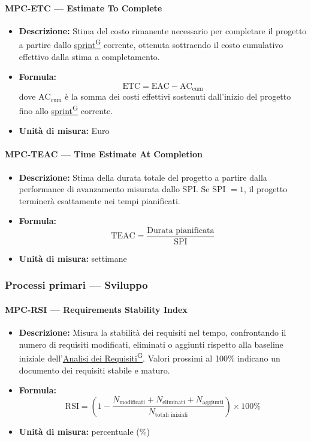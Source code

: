 \documentclass[a4paper,12pt]{article}
\providecommand{\glslink}[2]{\href{https://alittlebyte-19.github.io/Documentazione/glossario.html\#gls-#1}{\underline{#2}\textsuperscript{\scriptsize G}}}
\begin{document}
\paragraph{MPC-ETC --- Estimate To Complete}
\begin{itemize}
    \item \textbf{Descrizione:} Stima del costo rimanente necessario per completare il progetto a partire dallo \glslink{sprint}{sprint} corrente, ottenuta sottraendo il costo cumulativo effettivo dalla stima a completamento.
    \item \textbf{Formula:}
    $$\text{ETC} = \text{EAC} - \text{AC}_{\text{cum}}$$
    dove $\text{AC}_{\text{cum}}$ è la somma dei costi effettivi sostenuti dall'inizio del progetto fino allo \glslink{sprint}{sprint} corrente.
    \item \textbf{Unità di misura:} Euro
\end{itemize}

\paragraph{MPC-TEAC --- Time Estimate At Completion}
\begin{itemize}
    \item \textbf{Descrizione:} Stima della durata totale del progetto a partire dalla performance di avanzamento misurata dallo SPI. Se SPI $= 1$, il progetto terminerà esattamente nei tempi pianificati.
    \item \textbf{Formula:}
    $$\text{TEAC} = \frac{\text{Durata pianificata}}{\text{SPI}}$$
    \item \textbf{Unità di misura:} settimane
\end{itemize}

\subsubsection{Processi primari --- Sviluppo}

\paragraph{MPC-RSI --- Requirements Stability Index}
\begin{itemize}
    \item \textbf{Descrizione:} Misura la stabilità dei requisiti nel tempo, confrontando il numero di requisiti modificati, eliminati o aggiunti rispetto alla baseline iniziale dell'\glslink{analisi-dei-requisiti-adr}{Analisi dei Requisiti}. Valori prossimi al 100\% indicano un documento dei requisiti stabile e maturo.
    \item \textbf{Formula:}
    $$\text{RSI} = \left(1 - \frac{N_{\text{modificati}} + N_{\text{eliminati}} + N_{\text{aggiunti}}}{N_{\text{totali iniziali}}}\right) \times 100\%$$
    \item \textbf{Unità di misura:} percentuale (\%)
\end{itemize}
\end{document}
